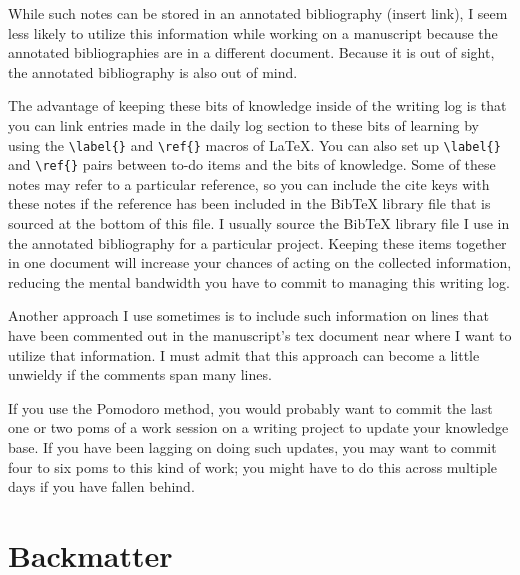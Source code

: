 \documentclass[10pt,letterpaper]{article}
\begin{document}
While such notes can be stored in an annotated bibliography (insert link), I seem less likely to utilize this information while working on a manuscript because the annotated bibliographies are in a different document.
Because it is out of sight, the annotated bibliography is also out of mind.

The advantage of keeping these bits of knowledge inside of the writing log is that you can link entries made in the daily log section to these bits of learning by using the \verb|\label{}| and \verb|\ref{}| macros of \LaTeX.
You can also set up \verb|\label{}| and \verb|\ref{}| pairs between to-do items and the bits of knowledge.
Some of these notes may refer to a particular reference, so you can include the cite keys with these notes if the reference has been included in the BibTeX library file that is sourced at the bottom of this file.
I usually source the BibTeX library file I use in the annotated bibliography for a particular project.
Keeping these items together in one document will increase your chances of acting on the collected information, reducing the mental bandwidth you have to commit to managing this writing log.

Another approach I use sometimes is to include such information on lines that have been commented out in the manuscript's tex document near where I want to utilize that information.
I must admit that this approach can become a little unwieldy if the comments span many lines.

If you use the Pomodoro method, you would probably want to commit the last one or two poms of a work session on a writing project to update your knowledge base.
If you have been lagging on doing such updates, you may want to commit four to six poms to this kind of work; you might have to do this across multiple days if you have fallen behind.


\section{Backmatter}

%

\printindex
\end{document}
